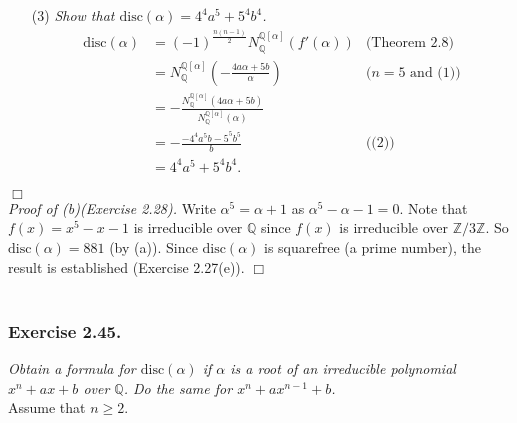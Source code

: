 \documentclass{article}
\begin{document}
\begin{enumerate}
\item[(3)]
  \emph{Show that $\textrm{disc}(\alpha) = 4^4 a^5 + 5^4 b^4$.}
  \begin{align*}
    \textrm{disc}(\alpha)
    &= (-1)^{\frac{n(n-1)}{2}} N_{\mathbb{Q}}^{\mathbb{Q}[\alpha]}(f'(\alpha))
      &\text{(Theorem 2.8)} \\
    &= N_{\mathbb{Q}}^{\mathbb{Q}[\alpha]}\left( -\frac{4a\alpha+5b}{\alpha} \right)
      &\text{($n=5$ and (1))} \\
    &= -\frac{N_{\mathbb{Q}}^{\mathbb{Q}[\alpha]}(4a\alpha+5b)}
      {N_{\mathbb{Q}}^{\mathbb{Q}[\alpha]}(\alpha)} \\
    &= - \frac{-4^4a^5b-5^5b^5}{b}
      &\text{((2))} \\
    &= 4^4 a^5 + 5^4 b^4.
  \end{align*}
\end{enumerate}
$\Box$ \\



\emph{Proof of (b)(Exercise 2.28).}
  Write $\alpha^5 = \alpha + 1$ as $\alpha^5 - \alpha - 1 = 0$.
  Note that $f(x) = x^5 - x - 1$ is irreducible over $\mathbb{Q}$
  since $f(x)$ is irreducible over $\mathbb{Z}/3\mathbb{Z}$.
  So $\textrm{disc}(\alpha) = 881$ (by (a)).
  Since $\textrm{disc}(\alpha)$ is squarefree (a prime number),
  the result is established (Exercise 2.27(e)).
$\Box$ \\\\






\subsubsection*{Exercise 2.45.}
\emph{Obtain a formula for $\textrm{disc}(\alpha)$ if $\alpha$ is a root of
an irreducible polynomial $x^n + ax + b$ over $\mathbb{Q}$.
Do the same for $x^n + ax^{n-1}+b$.} \\

Assume that $n \geq 2$. \\
\end{document}
